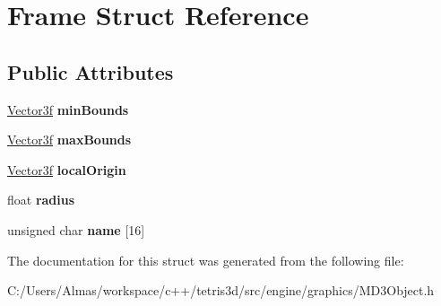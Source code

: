 \hypertarget{struct_frame}{\section{Frame Struct Reference}
\label{struct_frame}
}
\subsection*{Public Attributes}
\begin{DoxyCompactItemize}
\item 
\hypertarget{struct_frame_a4d5cf9308694dbf8123fce39aac63486}{\hyperlink{struct_vector3f}{Vector3f} {\bfseries min\-Bounds}}\label{struct_frame_a4d5cf9308694dbf8123fce39aac63486}

\item 
\hypertarget{struct_frame_a5b2e680dc88346d7f3fbc3120dbdb9d8}{\hyperlink{struct_vector3f}{Vector3f} {\bfseries max\-Bounds}}\label{struct_frame_a5b2e680dc88346d7f3fbc3120dbdb9d8}

\item 
\hypertarget{struct_frame_afcdb14b0b253043cb7e2bfd9f88da9d4}{\hyperlink{struct_vector3f}{Vector3f} {\bfseries local\-Origin}}\label{struct_frame_afcdb14b0b253043cb7e2bfd9f88da9d4}

\item 
\hypertarget{struct_frame_a90db1a96a26206224e618c516f804da1}{float {\bfseries radius}}\label{struct_frame_a90db1a96a26206224e618c516f804da1}

\item 
\hypertarget{struct_frame_a2e47fd25f72f13a75c21ebc1cdd7cc8d}{unsigned char {\bfseries name} \mbox{[}16\mbox{]}}\label{struct_frame_a2e47fd25f72f13a75c21ebc1cdd7cc8d}

\end{DoxyCompactItemize}


The documentation for this struct was generated from the following file\-:\begin{DoxyCompactItemize}
\item 
C\-:/\-Users/\-Almas/workspace/c++/tetris3d/src/engine/graphics/M\-D3\-Object.\-h\end{DoxyCompactItemize}
